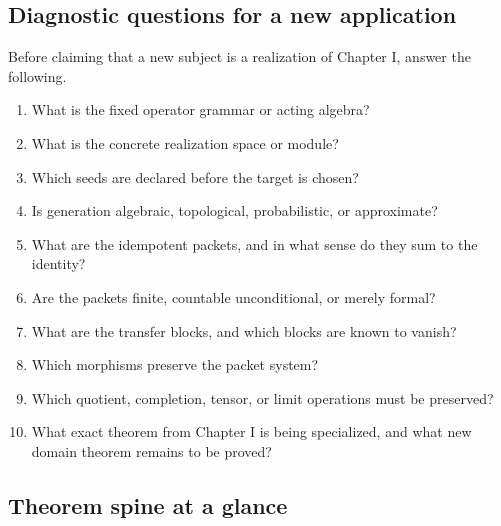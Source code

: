 \subsection{Diagnostic questions for a new application}
Before claiming that a new subject is a realization of Chapter I, answer the following.
\begin{enumerate}
\item What is the fixed operator grammar or acting algebra?
\item What is the concrete realization space or module?
\item Which seeds are declared before the target is chosen?
\item Is generation algebraic, topological, probabilistic, or approximate?
\item What are the idempotent packets, and in what sense do they sum to the identity?
\item Are the packets finite, countable unconditional, or merely formal?
\item What are the transfer blocks, and which blocks are known to vanish?
\item Which morphisms preserve the packet system?
\item Which quotient, completion, tensor, or limit operations must be preserved?
\item What exact theorem from Chapter I is being specialized, and what new domain theorem remains to be proved?
\end{enumerate}

\subsection{Theorem spine at a glance}

